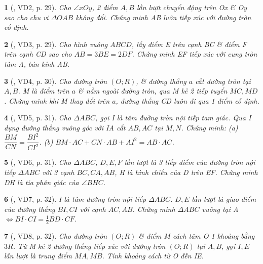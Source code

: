 \documentclass{article}
\newtheorem{baitoan}{}
\begin{document}
\begin{baitoan}[\cite{TLCT_THCS_Toan_9_hinh_hoc}, VD2, p. 29]
	Cho $\angle{xOy}$, 2 điểm $A,B$ lần lượt chuyển động trên Ox \& Oy sao cho chu vi $\Delta OAB$ không đổi. Chứng minh AB luôn tiếp xúc với đường tròn cố định.
\end{baitoan}

\begin{baitoan}[\cite{TLCT_THCS_Toan_9_hinh_hoc}, VD3, p. 29]
	Cho hình vuông $ABCD$, lấy điểm E trên cạnh BC \& điểm F trên cạnh CD sao cho $AB = 3BE = 2DF$. Chứng minh EF tiếp xúc với cung tròn tâm A, bán kính AB.
\end{baitoan}

\begin{baitoan}[\cite{TLCT_THCS_Toan_9_hinh_hoc}, VD4, p. 30]
	Cho đường tròn $(O;R)$, \& đường thẳng $a$ cắt đường tròn tại $A,B$. M là điểm trên $a$ \& nằm ngoài đường tròn, qua M kẻ 2 tiếp tuyển $MC,MD$. Chứng minh khi M thay đổi trên $a$, đường thẳng CD luôn đi qua 1 điểm cố định.
\end{baitoan}

\begin{baitoan}[\cite{TLCT_THCS_Toan_9_hinh_hoc}, VD5, p. 31]
	Cho $\Delta ABC$, gọi I là tâm đường tròn nội tiếp tam giác. Qua I dựng đường thẳng vuông góc với IA cắt $AB,AC$ tại $M,N$. Chứng minh: (a) $\dfrac{BM}{CN} = \dfrac{BI^2}{CI^2}$. (b) $BM\cdot AC + CN\cdot AB + AI^2 = AB\cdot AC$.
\end{baitoan}

\begin{baitoan}[\cite{TLCT_THCS_Toan_9_hinh_hoc}, VD6, p. 31]
	Cho $\Delta ABC$, $D,E,F$ lần lượt là 3 tiếp điểm của đường tròn nội tiếp $\Delta ABC$ với 3 cạnh $BC,CA,AB$, H là hình chiếu của D trên EF. Chứng minh DH là tia phân giác của $\angle{BHC}$.
\end{baitoan}

\begin{baitoan}[\cite{TLCT_THCS_Toan_9_hinh_hoc}, VD7, p. 32]
	I là tâm đường tròn nội tiếp $\Delta ABC$. $D,E$ lần lượt là giao điểm của đường thẳng $BI,CI$ với cạnh $AC,AB$. Chứng minh $\Delta ABC$ vuông tại A $\Leftrightarrow BI\cdot CI = \frac{1}{2}BD\cdot CF$.
\end{baitoan}

\begin{baitoan}[\cite{TLCT_THCS_Toan_9_hinh_hoc}, VD8, p. 32]
	Cho đường tròn $(O;R)$ \& điểm M cách tâm O 1 khoảng bằng $3R$. Từ M kẻ 2 đường thẳng tiếp xúc với đường tròn $(O;R)$ tại $A,B$, gọi $I,E$ lần lượt là trung điểm $MA,MB$. Tính khoảng cách từ O đến IE.
\end{baitoan}
\end{document}
